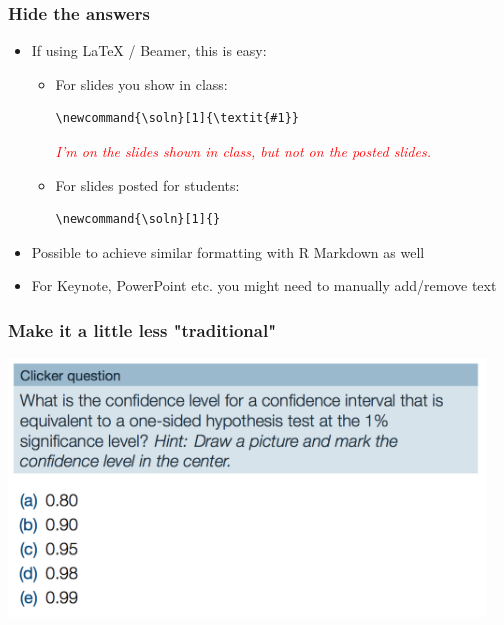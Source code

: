 \documentclass{beamer}
\newcommand{\soln}[1]{\textit{\textcolor{red}{#1}}}
\begin{document}
\begin{frame}[fragile]
\frametitle{Hide the answers}

\begin{itemize}

\item If using LaTeX / Beamer, this is easy:

\begin{itemize}

\item For slides you show in class:

\begin{verbatim}
\newcommand{\soln}[1]{\textit{#1}}
\end{verbatim}

\soln{I'm on the slides shown in class, but not on the posted slides.}

\item For slides posted for students:

\begin{verbatim}
\newcommand{\soln}[1]{}
\end{verbatim}

\end{itemize}

\pause

\item Possible to achieve similar formatting with R Markdown as well

\pause

\item For Keynote, PowerPoint etc. you might need to manually add/remove text

\end{itemize}


\end{frame}


\begin{frame}
\frametitle{Make it a little less "traditional"}

\begin{center}
\includegraphics[width = 0.95\textwidth]{figures/clicker-question}
\end{center}

\vfill

\end{frame}
\end{document}
